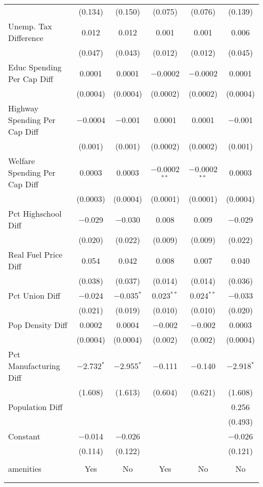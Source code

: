 \begin{table}[!htbp]
\begin{tabular}{@{\extracolsep{5pt}}lccccc}
  & (0.134) & (0.150) & (0.075) & (0.076) & (0.139) \\ 
  Unemp. Tax Difference & 0.012 & 0.012 & 0.001 & 0.001 & 0.006 \\ 
  & (0.047) & (0.043) & (0.012) & (0.012) & (0.045) \\ 
  Educ Spending Per Cap Diff & 0.0001 & 0.0001 & $-$0.0002 & $-$0.0002 & 0.0001 \\ 
  & (0.0004) & (0.0004) & (0.0002) & (0.0002) & (0.0004) \\ 
  Highway Spending Per Cap Diff & $-$0.0004 & $-$0.001 & 0.0001 & 0.0001 & $-$0.001 \\ 
  & (0.001) & (0.001) & (0.0002) & (0.0002) & (0.001) \\ 
  Welfare Spending Per Cap Diff & 0.0003 & 0.0003 & $-$0.0002$^{**}$ & $-$0.0002$^{**}$ & 0.0003 \\ 
  & (0.0003) & (0.0004) & (0.0001) & (0.0001) & (0.0004) \\ 
  Pct Highschool Diff & $-$0.029 & $-$0.030 & 0.008 & 0.009 & $-$0.029 \\ 
  & (0.020) & (0.022) & (0.009) & (0.009) & (0.022) \\ 
  Real Fuel Price Diff & 0.054 & 0.042 & 0.008 & 0.007 & 0.040 \\ 
  & (0.038) & (0.037) & (0.014) & (0.014) & (0.036) \\ 
  Pct Union Diff & $-$0.024 & $-$0.035$^{*}$ & 0.023$^{**}$ & 0.024$^{**}$ & $-$0.033 \\ 
  & (0.021) & (0.019) & (0.010) & (0.010) & (0.020) \\ 
  Pop Density Diff & 0.0002 & 0.0004 & $-$0.002 & $-$0.002 & 0.0003 \\ 
  & (0.0004) & (0.0004) & (0.002) & (0.002) & (0.0004) \\ 
  Pct Manufacturing Diff & $-$2.732$^{*}$ & $-$2.955$^{*}$ & $-$0.111 & $-$0.140 & $-$2.918$^{*}$ \\ 
  & (1.608) & (1.613) & (0.604) & (0.621) & (1.608) \\ 
  Population Diff &  &  &  &  & 0.256 \\ 
  &  &  &  &  & (0.493) \\ 
  Constant & $-$0.014 & $-$0.026 &  &  & $-$0.026 \\ 
  & (0.114) & (0.122) &  &  & (0.121) \\ 
 \hline \\[-1.8ex] 
amenities & Yes & No & Yes & No & No \\ 
\hline \\[-1.8ex] 
\hline 
\hline \\[-1.8ex] 
\end{tabular} 
\end{table} 
